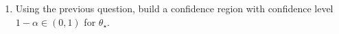 \documentclass[a4paper,10pt,fleqn]{article}
\newcommand{\eqsp}{\,}
\newcommand{\rset}{\ensuremath{\mathbb{R}}}
\newcommand{\bP}{\mathbb{P}}
\newcommand{\1}{\ensuremath{\mathbbm{1}}}
\newcommand{\param}{\theta}
\begin{document}
\begin{enumerate}
%
%
\item Using the previous question, build a confidence region with confidence level $1-\alpha\in(0,1)$ for $\param_\star$.
%
%
\end{enumerate}



%
\end{document}
